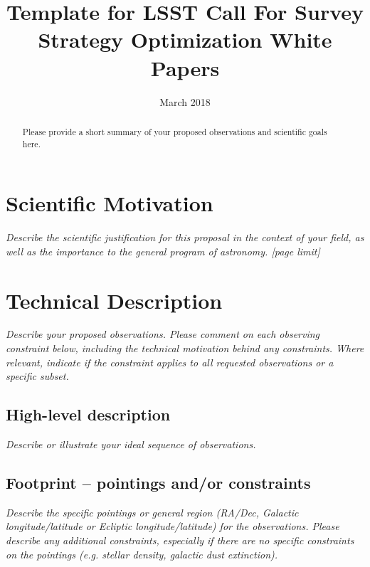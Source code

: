 \documentclass[11pt]{article}
\title{Template for LSST Call For Survey Strategy Optimization White Papers}
\author{}
\date{March 2018}
\begin{document}
\maketitle

\begin{abstract}
Please provide a short summary of your proposed observations and scientific goals here.
\end{abstract}

\section{Scientific Motivation}

\begin{footnotesize}
{\it Describe the scientific justification for this proposal in the context
of your field, as well as the importance to the general program of astronomy. [page limit]}
\end{footnotesize}

\vspace{.6in}

\section{Technical Description}
\begin{footnotesize}
{\it Describe your proposed observations. Please comment on each observing constraint
below, including the technical motivation behind any constraints. Where relevant, indicate
if the constraint applies to all requested observations or a specific subset.}
\end{footnotesize}

\subsection{High-level description}
\begin{footnotesize}
{\it Describe or illustrate your ideal sequence of observations.}
\end{footnotesize}

\vspace{.3in}

\subsection{Footprint -- pointings and/or constraints}
\begin{footnotesize}{\it Describe the specific pointings or general region (RA/Dec, Galactic longitude/latitude or 
Ecliptic longitude/latitude) for the observations. Please describe any additional constraints, especially if there
are no specific constraints on the pointings (e.g. stellar density, galactic dust extinction).}
\end{footnotesize}
\end{document}
